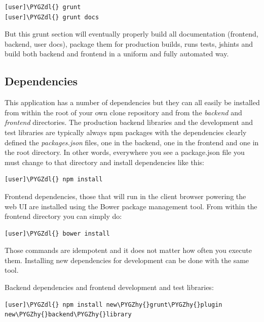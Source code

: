 \documentclass[letterpaper,10pt,english]{sphinxmanual}
\def\PYGZdl{\char`\$}
\def\PYGZhy{\char`\-}
\begin{document}
\begin{Verbatim}[commandchars=\\\{\}]
[user]\PYGZdl{} grunt
[user]\PYGZdl{} grunt docs
\end{Verbatim}

But this grunt section will eventually properly build all
documentation (frontend, backend, user docs), package them for
production builds, runs tests, jshints and build both backend and
frontend in a uniform and fully automated way.


\subsection{Dependencies}
\label{developer-guide:dependencies}
This application has a number of dependencies but they can all easily
be installed from within the root of your own clone repository and
from the \emph{backend} and \emph{frontend} directories. The production backend
libraries and the development and test libraries are typically always
npm packages with the dependencies clearly defined the \emph{packages.json}
files, one in the backend, one in the frontend and one in the root
directory. In other words, everywhere you see a package.json file you
must change to that directory and install dependencies like this:

\begin{Verbatim}[commandchars=\\\{\}]
[user]\PYGZdl{} npm install
\end{Verbatim}

Frontend dependencies, those that will run in the client browser
powering the web UI are installed using the Bower package management
tool. From within the frontend directory you can simply do:

\begin{Verbatim}[commandchars=\\\{\}]
[user]\PYGZdl{} bower install
\end{Verbatim}

Those commands are idempotent and it does not matter how often you
execute them. Installing new dependencies for development can be done
with the same tool.

Backend dependencies and frontend development and test libraries:

\begin{Verbatim}[commandchars=\\\{\}]
[user]\PYGZdl{} npm install new\PYGZhy{}grunt\PYGZhy{}plugin new\PYGZhy{}backend\PYGZhy{}library
\end{Verbatim}
\end{document}

